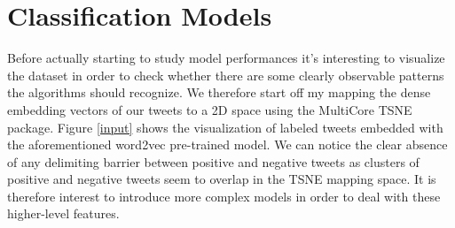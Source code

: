 \documentclass[10pt,conference,compsocconf,retainorgcmds]{IEEEtran}
\begin{document}
\section{Classification Models}
Before actually starting to study model performances it's interesting to visualize the dataset in order to check whether there are some clearly observable patterns the algorithms should recognize. We therefore start off my mapping the dense embedding vectors of our tweets to a 2D space using the MultiCore TSNE package. Figure \ref{input} shows the visualization of labeled tweets embedded with the aforementioned word2vec pre-trained model. We can notice the clear absence of any delimiting barrier between positive and negative tweets as clusters of positive and negative tweets seem to overlap in the TSNE mapping space. It is therefore interest to introduce more complex models in order to deal with these higher-level features.\\
\end{document}
